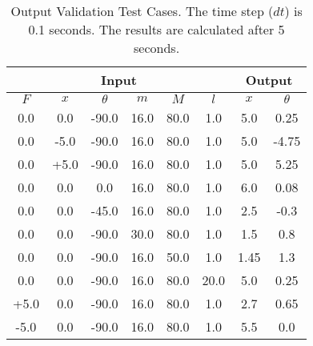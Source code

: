 \documentclass[12pt, titlepage]{article}
\begin{document}
\begin{table}[ht]
  \centering
  \caption{
    Output Validation Test Cases. The time step ($dt$) is 0.1 seconds.
    The results are calculated after 5 seconds.
  } \label{table:input_output}
  \vspace*{2mm}
  \begin{tabular}{|c c c c c c|c c|}
    \hline
    \multicolumn{6}{|c|}{Input} & \multicolumn{2}{c|}{Output}                                                   \\ \hline
    $F$                         & $x$                         & $\theta$ & $m$  & $M$  & $l$  & $x$  & $\theta$ \\ \hline
    0.0                         & 0.0                         & -90.0    & 16.0 & 80.0 & 1.0  & 5.0  & 0.25     \\ \hline
    0.0                         & -5.0                        & -90.0    & 16.0 & 80.0 & 1.0  & 5.0  & -4.75    \\ \hline
    0.0                         & +5.0                        & -90.0    & 16.0 & 80.0 & 1.0  & 5.0  & 5.25     \\ \hline
    0.0                         & 0.0                         & 0.0      & 16.0 & 80.0 & 1.0  & 6.0  & 0.08     \\ \hline
    0.0                         & 0.0                         & -45.0    & 16.0 & 80.0 & 1.0  & 2.5  & -0.3     \\ \hline
    0.0                         & 0.0                         & -90.0    & 30.0 & 80.0 & 1.0  & 1.5  & 0.8      \\ \hline
    0.0                         & 0.0                         & -90.0    & 16.0 & 50.0 & 1.0  & 1.45 & 1.3      \\ \hline
    0.0                         & 0.0                         & -90.0    & 16.0 & 80.0 & 20.0 & 5.0  & 0.25     \\ \hline
    +5.0                        & 0.0                         & -90.0    & 16.0 & 80.0 & 1.0  & 2.7  & 0.65     \\ \hline
    -5.0                        & 0.0                         & -90.0    & 16.0 & 80.0 & 1.0  & 5.5  & 0.0      \\ \hline
  \end{tabular}

\end{table}

\end{document}
